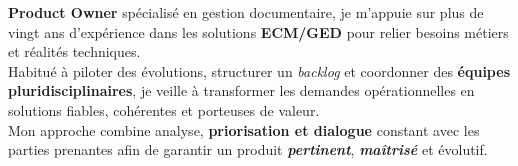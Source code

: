 
\par{
\textbf{Product Owner} spécialisé en gestion documentaire, je m’appuie sur plus de vingt ans d’expérience dans les solutions \textbf{ECM/GED} pour relier besoins métiers et réalités 
techniques. \\ 
Habitué à piloter des évolutions, structurer un \emph{backlog} et coordonner des \textbf{équipes pluridisciplinaires}, je veille à transformer les demandes opérationnelles en solutions fiables, cohérentes et porteuses de valeur. \\
Mon approche combine analyse, \textbf{priorisation et dialogue} constant avec les parties prenantes afin de garantir un produit \textbf{\emph{pertinent}}, \textbf{\emph{maîtrisé}} et évolutif.
}
